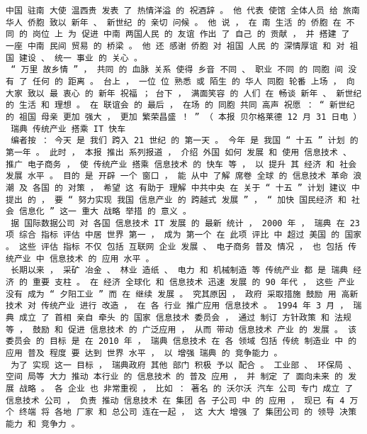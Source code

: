 \documentclass{article}
\begin{document}
\begin{Verbatim}[commandchars=\\\{\}]
 中国 驻南 大使 温西贵 发表 了 热情洋溢 的 祝酒辞 。 他 代表 使馆 全体人员 给 旅南 华人 侨胞 致以 新年 、 新世纪 的 亲切 问候 。 他 说 ， 在 南 生活 的 侨胞 在 不同 的 岗位 上 为 促进 中南 两国人民 的 友谊 作出 了 自己 的 贡献 ， 并 搭建 了 一座 中南 民间 贸易 的 桥梁 。 他 还 感谢 侨胞 对 祖国 人民 的 深情厚谊 和 对 祖国 建设 、 统一 事业 的 关心 。 
 “ 万里 故乡情 ” ， 共同 的 血脉 关系 使得 乡音 不同 、 职业 不同 的 同胞 间 没有 了 任何 的 距离 。 台上 ， 一位 位 熟悉 或 陌生 的 华人 同胞 轮番 上场 ， 向 大家 致以 最 衷心 的 新年 祝福 ； 台下 ， 满面笑容 的 人们 在 畅谈 新年 、 新世纪 的 生活 和 理想 。 在 联谊会 的 最后 ， 在场 的 同胞 共同 高声 祝愿 ： “ 新世纪 的 祖国 母亲 更加 强大 ， 更加 繁荣昌盛 ！ ” （ 本报 贝尔格莱德 12 月 31 日电 ） 
 瑞典 传统产业 搭乘 IT 快车 
 编者按 ： 今天 是 我们 跨入 21 世纪 的 第一天 。 今年 是 我国 “ 十五 ” 计划 的 第一年 。 此时 ， 本报 推出 系列报道 ， 介绍 外国 如何 发展 和 使用 信息技术 、 推广 电子商务 ， 使 传统产业 搭乘 信息技术 的 快车 等 ， 以 提升 其 经济 和 社会 发展 水平 。 目的 是 开辟 一个 窗口 ， 能 从中 了解 席卷 全球 的 信息技术 革命 浪潮 及 各国 的 对策 ， 希望 这 有助于 理解 中共中央 在 关于 “ 十五 ” 计划 建议 中 提出 的 ， 要 “ 努力实现 我国 信息产业 的 跨越式 发展 ” ， “ 加快 国民经济 和 社会 信息化 ” 这一 重大 战略 举措 的 意义 。 
 据 国际数据公司 对 各国 信息技术 IT 发展 的 最新 统计 ， 2000 年 ， 瑞典 在 23 项 综合 指标 评估 中居 世界 第一 ， 成为 第一个 在 此项 评比 中 超过 美国 的 国家 。 这些 评估 指标 不仅 包括 互联网 企业 发展 、 电子商务 普及 情况 ， 也 包括 传统产业 中 信息技术 的 应用 水平 。 
 长期以来 ， 采矿 冶金 、 林业 造纸 、 电力 和 机械制造 等 传统产业 都 是 瑞典 经济 的 重要 支柱 。 在 经济 全球化 和 信息技术 迅速 发展 的 90 年代 ， 这些 产业 没有 成为 “ 夕阳工业 ” 而 在 继续 发展 。 究其原因 ， 政府 采取措施 鼓励 用 高新技术 对 传统产业 进行 改造 ， 在 各 行业 推广应用 信息技术 。 1994 年 3 月 ， 瑞典 成立 了 首相 亲自 牵头 的 国家 信息技术 委员会 ， 通过 制订 方针政策 和 法规 等 ， 鼓励 和 促进 信息技术 的 广泛应用 ， 从而 带动 信息技术 产业 的 发展 。 该 委员会 的 目标 是 在 2010 年 ， 瑞典 信息技术 在 各 领域 包括 传统 制造业 中 的 应用 普及 程度 要 达到 世界 水平 ， 以 增强 瑞典 的 竞争能力 。 
 为了 实现 这一 目标 ， 瑞典政府 其他 部门 积极 予以 配合 。 工业部 、 环保局 、 空间 局等 大力 推动 本行业 的 信息技术 的 普及 应用 ， 并 制定 了 面向未来 的 发展 战略 。 各 企业 也 非常重视 ， 比如 ： 著名 的 沃尔沃 汽车 公司 专门 成立 了 信息技术 公司 ， 负责 推动 信息技术 在 集团 各 子公司 中 的 应用 ， 现已 有 4 万个 终端 将 各地 厂家 和 总公司 连在一起 ， 这 大大 增强 了 集团公司 的 领导 决策 能力 和 竞争力 。 

\end{Verbatim}
\end{document}
